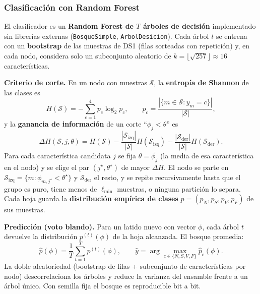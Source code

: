 \subsubsection{Clasificación con Random Forest}

El clasificador es un \textbf{Random Forest de $T$ árboles de decisión} implementado sin librerías externas (\texttt{BosqueSimple}, \texttt{ArbolDesicion}). Cada árbol $t$ se entrena con un \textbf{bootstrap} de las muestras de DS1 (filas sorteadas con repetición) y, en cada nodo, considera solo un subconjunto aleatorio de $k=\lfloor\sqrt{257}\rfloor\approx 16$ características.

\textbf{Criterio de corte.} En un nodo con muestras $\mathcal{S}$, la \textbf{entropía de Shannon} de las clases es
\begin{equation}
H(\mathcal{S})=-\sum_{c=1}^{4} p_c\log_2 p_c,\qquad p_c=\frac{|\{m\in\mathcal{S}:y_m=c\}|}{|\mathcal{S}|},
\end{equation}
y la \textbf{ganancia de información} de un corte ``$\phi_j<\theta$'' es
\begin{equation}
\Delta H(\mathcal{S},j,\theta)=H(\mathcal{S})-\frac{|\mathcal{S}_{\mathrm{izq}}|}{|\mathcal{S}|}H(\mathcal{S}_{\mathrm{izq}})-\frac{|\mathcal{S}_{\mathrm{der}}|}{|\mathcal{S}|}H(\mathcal{S}_{\mathrm{der}}).
\end{equation}
Para cada característica candidata $j$ se fija $\theta=\overline{\phi_j}$ (la media de esa característica en el nodo) y se elige el par $(j^\star,\theta^\star)$ de mayor $\Delta H$. El nodo se parte en $\mathcal{S}_{\mathrm{izq}}=\{m:\phi_{m,j^\star}<\theta^\star\}$ y $\mathcal{S}_{\mathrm{der}}$ el resto, y se repite recursivamente hasta que el grupo es puro, tiene menos de $\ell_{\min}$ muestras, o ninguna partición lo separa. Cada hoja guarda la \textbf{distribución empírica de clases} $p=(p_N,p_S,p_V,p_F)$ de sus muestras.

\textbf{Predicción (voto blando).} Para un latido nuevo con vector $\phi$, cada árbol $t$ devuelve la distribución $p^{(t)}(\phi)$ de la hoja alcanzada. El bosque promedia:
\begin{equation}
\hat{p}(\phi)=\frac{1}{T}\sum_{t=1}^{T}p^{(t)}(\phi),\qquad \hat{y}=\arg\max_{c\in\{N,S,V,F\}}\hat{p}_c(\phi).
\end{equation}
La doble aleatoriedad (bootstrap de filas + subconjunto de características por nodo) descorrelaciona los árboles y reduce la varianza del ensamble frente a un árbol único. Con semilla fija el bosque es reproducible bit a bit.

